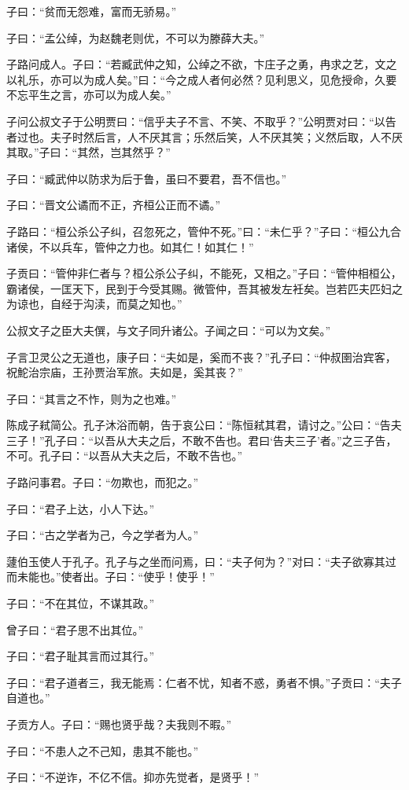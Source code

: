 \documentclass[twoside,openany]{book}
\begin{document}
子曰：“贫而无怨难，富而无骄易。”

子曰：“孟公绰，为赵魏老则优，不可以为滕薛大夫。”

子路问成人。子曰：“若臧武仲之知，公绰之不欲，卞庄子之勇，冉求之艺，文之以礼乐，亦可以为成人矣。”曰：“今之成人者何必然？见利思义，见危授命，久要不忘平生之言，亦可以为成人矣。”

子问公叔文子于公明贾曰：“信乎夫子不言、不笑、不取乎？”公明贾对曰：“以告者过也。夫子时然后言，人不厌其言；乐然后笑，人不厌其笑；义然后取，人不厌其取。”子曰：“其然，岂其然乎？”

子曰：“臧武仲以防求为后于鲁，虽曰不要君，吾不信也。”

子曰：“晋文公谲而不正，齐桓公正而不谲。”

子路曰：“桓公杀公子纠，召忽死之，管仲不死。”曰：“未仁乎？”子曰：“桓公九合诸侯，不以兵车，管仲之力也。如其仁！如其仁！”

子贡曰：“管仲非仁者与？桓公杀公子纠，不能死，又相之。”子曰：“管仲相桓公，霸诸侯，一匡天下，民到于今受其赐。微管仲，吾其被发左衽矣。岂若匹夫匹妇之为谅也，自经于沟渎，而莫之知也。”

公叔文子之臣大夫僎，与文子同升诸公。子闻之曰：“可以为文矣。”

子言卫灵公之无道也，康子曰：“夫如是，奚而不丧？”孔子曰：“仲叔圉治宾客，祝鮀治宗庙，王孙贾治军旅。夫如是，奚其丧？”

子曰：“其言之不怍，则为之也难。”

陈成子弒简公。孔子沐浴而朝，告于哀公曰：“陈恒弒其君，请讨之。”公曰：“告夫三子！”孔子曰：“以吾从大夫之后，不敢不告也。君曰‘告夫三子’者。”之三子告，不可。孔子曰：“以吾从大夫之后，不敢不告也。”

子路问事君。子曰：“勿欺也，而犯之。”

子曰：“君子上达，小人下达。”

子曰：“古之学者为己，今之学者为人。”

蘧伯玉使人于孔子。孔子与之坐而问焉，曰：“夫子何为？”对曰：“夫子欲寡其过而未能也。”使者出。子曰：“使乎！使乎！”

子曰：“不在其位，不谋其政。”

曾子曰：“君子思不出其位。”

子曰：“君子耻其言而过其行。”

子曰：“君子道者三，我无能焉：仁者不忧，知者不惑，勇者不惧。”子贡曰：“夫子自道也。”

子贡方人。子曰：“赐也贤乎哉？夫我则不暇。”

子曰：“不患人之不己知，患其不能也。”

子曰：“不逆诈，不亿不信。抑亦先觉者，是贤乎！”
\end{document}
